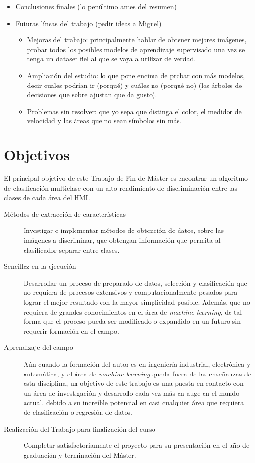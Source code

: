 \begin{itemize}
	\item Conclusiones finales (lo penúltimo antes del resumen)
	\item Futuras líneas del trabajo (pedir ideas a Miguel)
	\begin{itemize}
		\item Mejoras del trabajo: principalmente hablar de obtener mejores imágenes, probar todos los posibles modelos de aprendizaje supervisado una vez se tenga un dataset fiel al que se vaya a utilizar de verdad.
		\item Ampliación del estudio: lo que pone encima de probar con más modelos, decir cuales podrían ir (porqué) y cuáles no (porqué no) (los árboles de decisiones que sobre ajustan que da gusto).
		\item Problemas sin resolver: que yo sepa que distinga el color, el medidor de velocidad y las áreas que no sean símbolos sin más.
	\end{itemize}
\end{itemize}


\chapter{Objetivos}

El principal objetivo de este Trabajo de Fin de Máster es encontrar un algoritmo de clasificación multiclase con un alto rendimiento de discriminación entre las clases de cada área del HMI.

\begin{description}
	\item[Métodos de extracción de características] Investigar e implementar métodos de obtención de datos, sobre las imágenes a discriminar, que obtengan información que permita al clasificador separar entre clases.
	\item[Sencillez en la ejecución] Desarrollar un proceso de preparado de datos, selección y clasificación que no requiera de procesos extensivos y computacionalmente pesados para lograr el mejor resultado con la mayor simplicidad posible. Además, que no requiera de grandes conocimientos en el área de \textit{machine learning}, de tal forma que el proceso pueda ser modificado o expandido en un futuro sin requerir formación en el campo.
	\item[Aprendizaje del campo] Aún cuando la formación del autor es en ingeniería industrial, electrónica y automática, y el área de \textit{machine learning} queda fuera de las enseñanzas de esta disciplina, un objetivo de este trabajo es una puesta en contacto con un área de investigación y desarrollo cada vez más en auge en el mundo actual, debido a su increíble potencial en casi cualquier área que requiera de clasificación o regresión de datos.
	\item[Realización del Trabajo para finalización del curso] Completar satisfactoriamente el proyecto para su presentación en el año de graduación y terminación del Máster.
\end{description}

